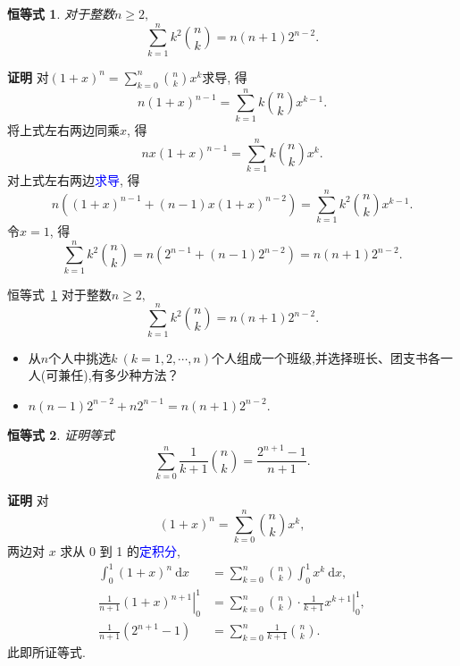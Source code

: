 \documentclass[punct]{ctexbeamer}
\newtheorem{iden}{恒等式}
\newcommand{\blue}{\textcolor{blue}}
\begin{document}
\begin{frame}
\begin{iden}\label{eq:kk}
对于整数$n \ge 2,$
    $$\sum_{k=1}^{n} k^{2}\binom{n}{k}=n(n+1) 2^{n-2}.$$
\end{iden}
	\pause
	\textbf{ 证明 } \quad  对$(1+x)^{n}=\sum_{k=0}^{n}\binom{n}{k}x^{k}$求导, 得
    \[n(1+x)^{n-1}=\sum_{k=1}^{n}k\binom{n}{k}x^{k-1}.\]
	将上式左右两边同乘$x$, 得
    \[
	nx(1+x)^{n-1}=\sum_{k=1}^{n}k\binom{n}{k}x^{k}.
	\]
	对上式左右两边\blue{求导}, 得
    \[
	n\left((1+x)^{n-1}+(n-1) x(1+x)^{n-2} \right)=\sum_{k=1}^{n} k^{2}\binom{n}{k} x^{k-1}.
	\]
	令$x=1$, 得
    \[
	\sum_{k=1}^{n} k^{2}\binom{n}{k} =n\left(  2^{n-1}+(n-1) 2^{n-2}   \right)=n(n+1) 2^{n-2}.
	\]

\end{frame}

\begin{frame}
\begin{block}{恒等式\, \ref{eq:kk}}
对于整数$n \ge 2,$
		$$\sum_{k=1}^{n} k^{2}\binom{n}{k}=n(n+1) 2^{n-2}.$$
\end{block}

	\begin{itemize}

	\item 从$n$个人中挑选$k\ (k=1, 2, \cdots, n)$个人组成一个班级,并选择班长、团支书各一人(可兼任),有多少种方法？
    \pause
\item $n(n-1)2^{n-2}+n 2^{n-1}=n(n+1) 2^{n-2}.$
	\end{itemize}
\end{frame}


\begin{frame}
	\begin{iden}
		证明等式$$\sum_{k=0}^{n} \frac{1}{k+1} \binom{n}{k}   =\frac{2^{n+1}-1}{n+1}.$$
	\end{iden}
	\pause
	\textbf{ 证明 } \quad 对
	$$
(1+x)^{n}=\sum_{k=0}^{n}\binom{n}{k} x^{k},
	$$
	两边对 $x$ 求从 0 到 1 的\blue{定积分},
	\begin{align*}
		\int_{0}^{1}(1+x)^{n} \mathrm{~d} x & =\sum_{k=0}^{n}\binom{n}{k} \int_{0}^{1} x^{k} \mathrm{~d} x, \\
		\left.\frac{1}{n+1}(1+x)^{n+1}\right|_{0} ^{1} & =\left.\sum_{k=0}^{n}\binom{n}{k} \cdot \frac{1}{k+1} x^{k+1}\right|_{0} ^{1}, \\
		\frac{1}{n+1}\left(2^{n+1}-1\right) & =\sum_{k=0}^{n} \frac{1}{k+1}\binom{n}{k}.
	\end{align*}
	此即所证等式.


\end{frame}
\end{document}
